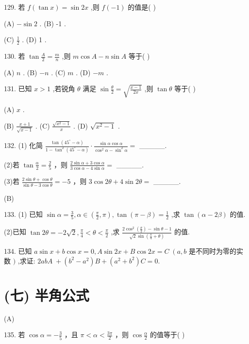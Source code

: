 \documentclass[10pt]{article}
\begin{document}
129. 若 \(f\left( {\tan x}\right)  = \sin {2x}\) ,则 \(f\left( {-1}\right)\) 的值是( )

(A) \(- \sin 2\) . (B) -1 .

(C) \(\frac{1}{2}\) . (D) 1 .

130. 若 \(\tan \frac{A}{2} = \frac{m}{n}\) ,则 \(m\cos A - n\sin A\) 等于( )

(A) \(n\) . (B) \(- n\) . (C) \(m\) . (D) \(- m\) .

131. 已知 \(x > 1\) ,若锐角 \(\theta\) 满足 \(\sin \frac{\theta }{2} = \sqrt{\frac{x - 1}{2x}}\) ,则 \(\tan \theta\) 等于( )

(A) \(x\) .

(B) \(\frac{x + 1}{\sqrt{x - 1}}\) . (C) \(\frac{\sqrt{{x}^{2} - 1}}{x}\) . (D) \(\sqrt{{x}^{2} - 1}\) .

132. (1) 化简 \(\frac{\tan \left( {{45}^{ \circ  } - \alpha }\right) }{1 - {\tan }^{2}\left( {{45}^{ \circ  } - \alpha }\right) } \cdot  \frac{\sin \alpha \cos \alpha }{{\cos }^{2}\alpha  - {\sin }^{2}\alpha } =\) \_\_\_\_\_.

(2)若 \(\tan \frac{\alpha }{2} = \frac{2}{5}\) ，则 \(\frac{2\sin \alpha  + 3\cos \alpha }{3\cos \alpha  - 4\sin \alpha } =\) \_\_\_\_\_.

(3)若 \(\frac{2\sin \theta  + \cos \theta }{\sin \theta  - 3\cos \theta } =  - 5\) ，则 \(3\cos {2\theta } + 4\sin {2\theta } =\) \_\_\_\_\_.

(B)

133. (1) 已知 \(\sin \alpha  = \frac{3}{5},\alpha  \in  \left( {\frac{\pi }{2},\pi }\right) ,\tan \left( {\pi  - \beta }\right)  = \frac{1}{2}\) ,求 \(\tan \left( {\alpha  - {2\beta }}\right)\) 的值.

(2)已知 \(\tan {2\theta } =  - 2\sqrt{2},\frac{\pi }{4} < \theta  < \frac{\pi }{2}\) ,求 \(\frac{2{\cos }^{2}\left( \frac{\theta }{2}\right)  - \sin \theta  - 1}{\sqrt{2}\sin \left( {\frac{\pi }{4} + \theta }\right) }\) 的值.

134. 已知 \(a\sin x + b\cos x = 0,A\sin {2x} + B\cos {2x} = C\;\left( {a,b}\right.\) 是不同时为零的实数 \()\) ,求证: \({2abA} \; + \left( {{b}^{2} - {a}^{2}}\right) B + \left( {{a}^{2} + {b}^{2}}\right) C = 0.\)

\section*{(七) 半角公式}

(A)

135. 若 \(\cos \alpha  =  - \frac{3}{5}\) ，且 \(\pi  < \alpha  < \frac{3\pi }{2}\) ，则 \(\cos \frac{\alpha }{2}\) 的值等于( )
\end{document}
